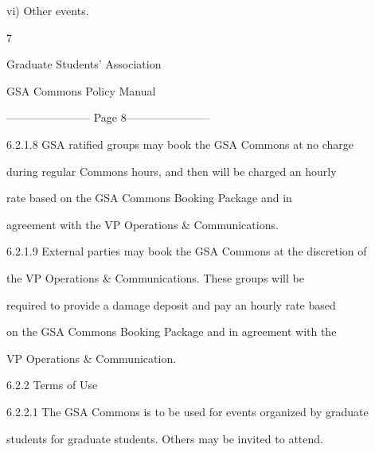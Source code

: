   



     vi)      Other events.   



  



                                                         7  

                                       

                                     Graduate Students’ Association  

                                     GSA Commons Policy Manual  

  


----------------------- Page 8-----------------------

6.2.1.8   GSA  ratified  groups  may  book  the  GSA  Commons  at  no  charge  

            during regular Commons hours, and then will be charged an hourly  

            rate   based   on   the   GSA   Commons   Booking   Package   and   in  

            agreement with the VP Operations & Communications.  



6.2.1.9   External parties may book the GSA Commons at the discretion of  

            the   VP   Operations   &   Communications.   These  groups   will  be  

            required to provide a damage deposit and pay an hourly rate based  

            on the GSA Commons Booking Package and in agreement with the  

            VP Operations & Communication.  



  



         6.2.2  Terms of Use   



  



6.2.2.1   The GSA Commons is to be used for events organized by graduate  

            students for graduate students. Others may be invited to attend.   



  



